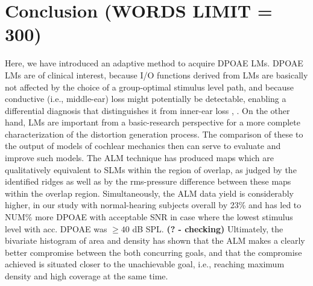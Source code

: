 \documentclass[journal,twoside,web]{ieeecolor2}
\begin{document}
\section{Conclusion (WORDS LIMIT = 300)}
Here, we have introduced an adaptive method to acquire DPOAE LMs. DPOAE LMs are of clinical interest, because I/O functions derived from LMs are basically not affected by the choice of a group-optimal stimulus level path, and because conductive (i.e., middle-ear) loss might potentially be detectable, enabling a differential diagnosis that distinguishes it from inner-ear loss \cite{Js2005}, \cite{Ma2017}. On the other hand, LMs are important from a basic-research perspective for a more complete characterization of the distortion generation process. The comparison of these to the output of models of cochlear mechanics then can serve to evaluate and improve such models.
The ALM technique has produced maps which are qualitatively equivalent to SLMs within the region of overlap, as judged by the identified ridges as well as by the rms-pressure difference between these maps within the overlap region. Simultaneously, the ALM data yield is considerably higher, in our study with normal-hearing subjects overall by 23\% and has led to NUM\% more DPOAE with acceptable SNR in case where the lowest stimulus level with acc. DPOAE was $\ge 40$ dB SPL. {\bf (? - checking)}
Ultimately, the bivariate histogram of area and density has shown that the ALM makes a clearly better compromise between the both concurring goals, and that the compromise achieved is situated closer to the unachievable goal, i.e., reaching maximum density and high coverage at the same time.




\end{document}
